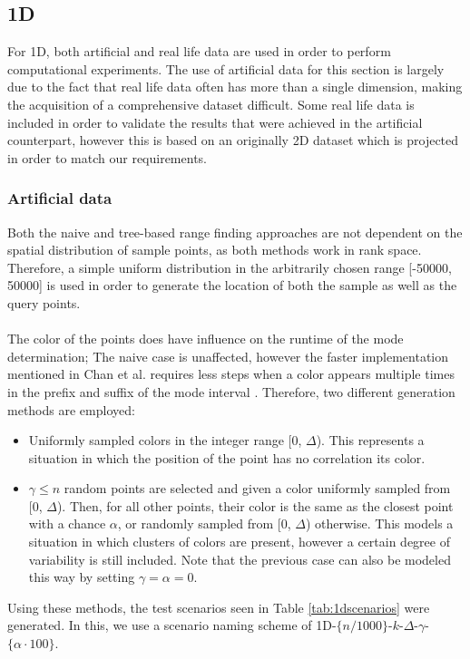 \documentclass{article}
\newcommand{\fb}[1]{{#1}}
\begin{document}
\subsection{1D}
For 1D, both artificial and real life data \fb{are} used in order to perform
computational experiments. The use of artificial data for this section \fb{is} largely due to the fact that real life data often has more than a single
dimension, making the acquisition of a comprehensive dataset difficult.
Some real life data \fb{is} included in order to validate the results that were
achieved in the artificial counterpart, however this \fb{is} based on an originally
2D dataset which \fb{is} projected in order to match our requirements.
\subsubsection*{Artificial data} Both the naive and tree-based range finding
approaches are not dependent on the spatial distribution of sample points, as
both methods work in rank space. Therefore, a simple uniform distribution in
the arbitrarily chosen range [-50000, 50000] \fb{is} used in order to generate the
location of both the sample as well as the query points. \\\\ The color of the
points does have influence on the runtime of the mode determination; The naive
case is unaffected, however the faster implementation mentioned in Chan et al.
requires less steps when a color appears multiple times in the prefix and
suffix of the mode interval \cite{Chan2014}. Therefore, two different
generation methods \fb{are} employed:
\begin{itemize}
    \item Uniformly sampled colors in the integer range [0, $\Delta$). This represents a
          situation in which the position of the point has no correlation its color.
    \item $\gamma \leq n$ random points are selected and given a color uniformly sampled from [0, $\Delta$). Then, for all other points, their color is the same as the closest point with a chance $\alpha$, or randomly sampled from [0, $\Delta$) otherwise. This models a situation in which clusters of colors are present, however a certain degree of variability is still included. Note that the previous case can also be modeled this way by setting $\gamma=\alpha=0$.
\end{itemize}
Using these methods, the test scenarios \fb{seen in Table \ref{tab:1dscenarios} were generated. In this, we use a scenario naming scheme of 1D-$\{n/1000\}$-$k$-$\Delta$-$\gamma$-$\{\alpha \cdot 100\}$.} \\
\end{document}
